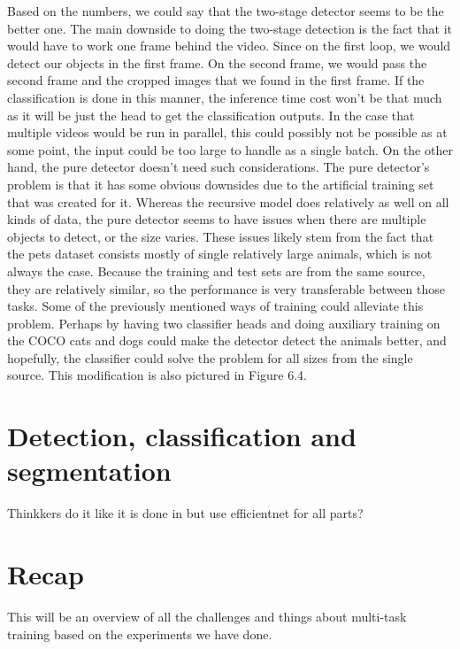 Based on the numbers, we could say that the two-stage detector seems to be the better one.
The main downside to doing the two-stage detection is the fact that it would have to work one frame behind the video.
Since on the first loop, we would detect our objects in the first frame.
On the second frame, we would pass the second frame and the cropped images that we found in the first frame.
If the classification is done in this manner, the inference time cost won't be that much as it will be just the head to get the classification outputs.
In the case that multiple videos would be run in parallel, this could possibly not be possible as at some point, the input could be too large to handle as a single batch.
On the other hand, the pure detector doesn't need such considerations.
The pure detector's problem is that it has some obvious downsides due to the artificial training set that was created for it.
Whereas the recursive model does relatively as well on all kinds of data, the pure detector seems to have issues when there are multiple objects to detect, or the size varies.
These issues likely stem from the fact that the pets dataset consists mostly of single relatively large animals, which is not always the case.
Because the training and test sets are from the same source, they are relatively similar, so the performance is very transferable between those tasks.
Some of the previously mentioned ways of training could alleviate this problem.
Perhaps by having two classifier heads and doing auxiliary training on the COCO cats and dogs could make the detector detect the animals better, and hopefully, the classifier could solve the problem for all sizes from the single source.
This modification is also pictured in Figure 6.4.

\section{Detection, classification and segmentation}
Thinkkers do it like it is done in \citep{multinet} but use efficientnet for all parts?

\section{Recap}
This will be an overview of all the challenges and things about multi-task training based on the experiments we have done.